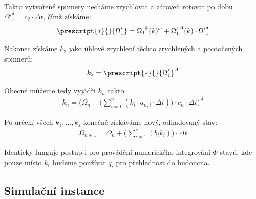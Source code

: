 \clearpage

Takto vytvořené spinnery necháme zrychlovat a zároveň rotovat po dobu ${\Omega'}_1^\delta = c_2 \cdot \Delta t$, čímž získáme:
\begin{equation}
    \label{eq:sim_equations_formalized9}
    \begin{gathered}
        \prescript{*}{}{\Omega_1'} = {\Omega_1}^{\mathbb{P}} (k) ^{\omega} + {\Omega_1'}^{A} (k) \cdot {\Omega'}_1^\delta
    \end{gathered}
\end{equation}

Nakonec získáme $k_2$ jako úhlové zrychlení těchto zrychlených a pootočených spinnerů:
\begin{equation}
    \label{eq:sim_equations_formalized10}
    \begin{gathered}
        k_2 = \prescript{*}{}{\Omega_1'}^{A}
    \end{gathered}
\end{equation}

Obecně můžeme tedy vyjádři $k_{n}$ takto:
\begin{equation}
    \label{eq:sim_equations_formalized11}
    \begin{gathered}
        k_{n} = \Bigg( {\Omega_n} + \Bigg( \sum_{i=1}^{n} ( k_i \cdot a_{n, i} \cdot \Delta t) \Bigg) \cdot c_{n} \cdot \Delta t \Bigg)^A
    \end{gathered}
\end{equation}

Po určení všech $k_1, \ldots, k_s$ konečně získáváme nový, odhadovaný stav:
\begin{equation}
    \label{eq:sim_equations_formalized12}
    \begin{gathered}
        {\Omega_{n+1}} = \Omega_{n} + \Bigg(\sum_{i=1}^{s} ( b_i k_i)\Bigg) \cdot \Delta t
    \end{gathered}
\end{equation}

Identicky funguje postup i pro provádění numerického integrování $\Phi$-stavů, kde pouze místo $k_i$ budeme používat $q_i$ pro přehlednost do budoucna.

\subsection{Simulační instance}

